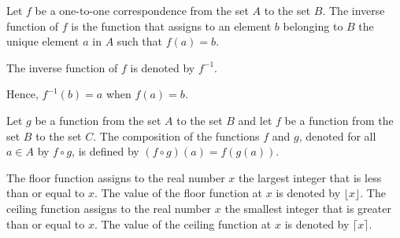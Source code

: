 \begin{defn}[inverse]
Let $f$ be a one-to-one correspondence from the set $A$ to the set $B$. The inverse function of
$f$ is the function that assigns to an element $b$ belonging to $B$ the unique element $a$ in $A$
such that $f(a)=b$.

The inverse function of $f$ is denoted by $f^{-1}$. 

Hence, $f^{-1}(b)=a$
when
$f(a)=b$.


\end{defn}

\begin{defn}[composition]
Let $g$ be a function from the set $A$ to the set $B$ and let $f$ be a function from the set $B$ to the
set $C$. The composition of the functions $f$ and $g$, denoted for all $a \in A$ by $f \circ g$, is defined
by
$(f \circ g)(a) = f (g(a))$.
\end{defn}
\begin{defn}[floor]
The floor function assigns to the real number $x$ the largest integer that is less than or equal to
$x$. The value of the floor function at $x$ is denoted by $\lfloor x \rfloor$. The ceiling function assigns to the
real number $x$ the smallest integer that is greater than or equal to $x$. The value of the ceiling
function at $x$ is denoted by $\lceil x \rceil$.
\end{defn}

